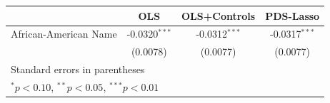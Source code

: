 {

\begin{tabular}{l*{3}{c}}
\toprule
                &\multicolumn{1}{c}{OLS}&\multicolumn{1}{c}{OLS+Controls}&\multicolumn{1}{c}{PDS-Lasso}\\
\midrule
African-American Name&  -0.0320$^{***}$&  -0.0312$^{***}$&  -0.0317$^{***}$\\
                & (0.0078)         & (0.0077)         & (0.0077)         \\
\bottomrule
\multicolumn{4}{l}{\footnotesize Standard errors in parentheses}\\
\multicolumn{4}{l}{\footnotesize $^{*}p<0.10$, $^{**}p<0.05$, $^{***}p<0.01$}\\
\end{tabular}
}

